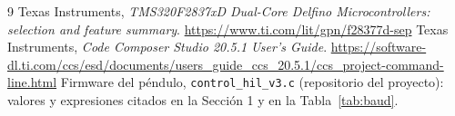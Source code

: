 \documentclass[12pt,letterpaper]{article}
\begin{document}
\begin{thebibliography}{9}
 Texas Instruments, \textit{TMS320F2837xD Dual-Core Delfino Microcontrollers: selection and feature summary}. \url{https://www.ti.com/lit/gpn/f28377d-sep}
 Texas Instruments, \textit{Code Composer Studio 20.5.1 User's Guide}. \url{https://software-dl.ti.com/ccs/esd/documents/users_guide_ccs_20.5.1/ccs_project-command-line.html}
 Firmware del péndulo, \texttt{control\_hil\_v3.c} (repositorio del proyecto): valores y expresiones citados en la Sección 1 y en la Tabla~\ref{tab:baud}.
\end{thebibliography}
\end{document}
